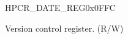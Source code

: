 \begin{register}{H}{PCR\_DATE\_REG}{0x0FFC}\label{regdesc:PCRDATEREG}
%
%
\regnewline%
\begin{regdesc}\begin{reglist}
\label{fielddesc:PCRDATE}\item [PCR\_DATE] Version control register. (R/W)
\end{reglist}\end{regdesc}
\end{register}



